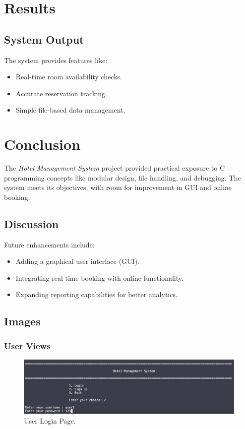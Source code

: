 \documentclass[12pt,a4paper]{article}
\begin{document}
\section{Results}
\subsection{System Output}
The system provides features like:
\begin{itemize}
    \item Real-time room availability checks.
    \item Accurate reservation tracking.
    \item Simple file-based data management.
\end{itemize}

\section{Conclusion}
The \textit{Hotel Management System} project provided practical exposure to C programming concepts like modular design, file handling, and debugging. The system meets its objectives, with room for improvement in GUI and online booking.

\subsection{Discussion}
Future enhancements include:
\begin{itemize}
    \item Adding a graphical user interface (GUI).
    \item Integrating real-time booking with online functionality.
    \item Expanding reporting capabilities for better analytics.
\end{itemize}

\clearpage
\vspace{0.5em}

\subsection{Images}

\subsubsection{User Views}
\begin{figure}[!htbp]
    \centering
    \includegraphics[width=\linewidth]{user-login.png} %
    \caption{User Login Page.}
\end{figure}
\end{document}
